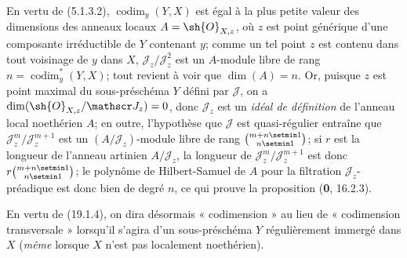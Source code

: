 En vertu de (5.1.3.2), $\operatorname{codim}_y(Y,X)$ est égal à la plus petite valeur des dimensions des anneaux locaux $A=\sh{O}_{X,z}$, où $z$ est point générique d'une composante
irréductible de $Y$ contenant $y$; comme un tel point $z$ est contenu dans tout voisinage de $y$ dans $X$, $\mathscr J_z/\mathscr J_z^2$ est un $A$-module libre de rang $n=\operatorname{codim}_y^*(Y,X)$; tout revient à voir que $\dim(A)=n$. Or, puisque $z$ est point maximal du sous-préschéma $Y$ défini par $\mathscr J$, on a $\dim(\sh{O}_{X,z}/\mathscr J_z)=0$, donc $\mathscr J_z$ est un \emph{idéal de définition} de l'anneau local noethérien $A$; en outre, l'hypothèse que $\mathscr J$ est quasi-régulier entraîne que $\mathscr J_z^m/\mathscr J_z^{m+1}$ est un $(A/\mathscr J_z)$-module libre de rang $\binom{m+n\setmin 1}{n\setmin 1}$; si $r$ est la longueur de l'anneau artinien $A/\mathscr J_z$, la longueur de $\mathscr J_z^m/\mathscr J_z^{m+1}$ est donc $r\binom{m+n\setmin 1}{n\setmin 1}$; le polynôme de Hilbert-Samuel de $A$ pour la filtration $\mathscr J_z$-préadique est donc bien de degré $n$, ce qui prouve la proposition (\textbf{0}, 16.2.3).

En vertu de (19.1.4), on dira désormais « codimension » au lieu de « codimension transversale » lorsqu'il s'agira d'un sous-préschéma $Y$ régulièrement immergé dans $X$ (\emph{même} lorsque $X$ n'est pas localement noethérien).

